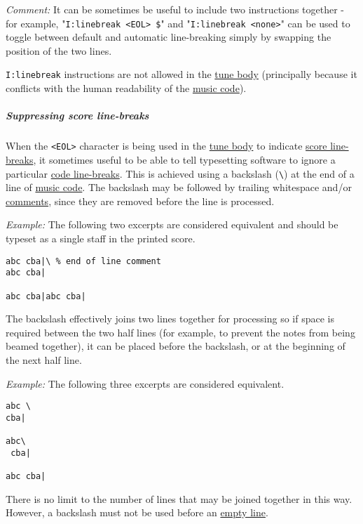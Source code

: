 \emph{Comment:} It can be sometimes be useful to include two
instructions together - for example,
"\texttt{I:linebreak\ \textless{}EOL\textgreater{}\ \$}" and
"\texttt{I:linebreak\ \textless{}none\textgreater{}}" can be used to
toggle between default and automatic line-breaking simply by swapping
the position of the two lines.

\texttt{I:linebreak} instructions are not allowed in the
\protect\hyperlink{tune_body_definition}{tune body} (principally because
it conflicts with the human readability of the
\protect\hyperlink{music_code_definition}{music code}).

\subparagraph{Suppressing score
line-breaks}\label{suppressing_score_line-breaks}

When the \texttt{\textless{}EOL\textgreater{}} character is being used
in the \protect\hyperlink{tune_body_definition}{tune body} to indicate
\protect\hyperlink{score_line-break_definition}{score line-breaks}, it
sometimes useful to be able to tell typesetting software to ignore a
particular \protect\hyperlink{code_line-break_definition}{code
line-breaks}. This is achieved using a backslash
(\texttt{\textbackslash{}}) at the end of a line of
\protect\hyperlink{music_code_definition}{music code}. The backslash may
be followed by trailing whitespace and/or
\protect\hyperlink{comment_definition}{comments}, since they are removed
before the line is processed.

\emph{Example:} The following two excerpts are considered equivalent and
should be typeset as a single staff in the printed score.

\begin{verbatim}
abc cba|\ % end of line comment
abc cba|

abc cba|abc cba|
\end{verbatim}

The backslash effectively joins two lines together for processing so if
space is required between the two half lines (for example, to prevent
the notes from being beamed together), it can be placed before the
backslash, or at the beginning of the next half line.

\emph{Example:} The following three excerpts are considered equivalent.

\begin{verbatim}
abc \
cba|

abc\
 cba|

abc cba|  
\end{verbatim}

There is no limit to the number of lines that may be joined together in
this way. However, a backslash must not be used before an
\protect\hyperlink{empty_line_definition}{empty line}.

